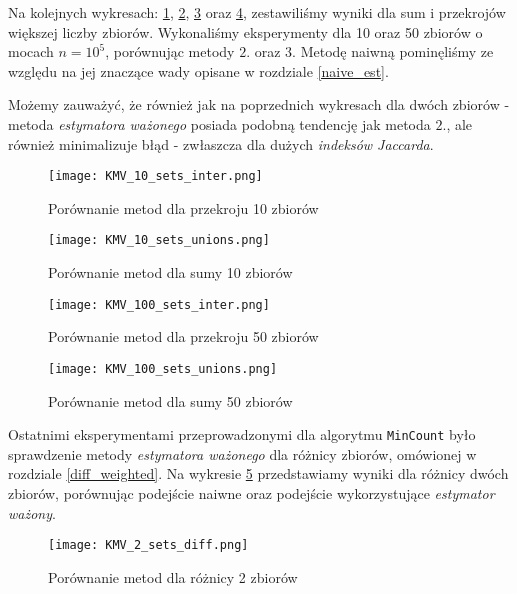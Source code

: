 Na kolejnych wykresach: \ref{fig:KMV_10sets_inter}, \ref{fig:KMV_10sets_unions}, \ref{fig:KMV_100sets_inter} oraz \ref{fig:KMV_100sets_unions}, zestawiliśmy wyniki dla sum i przekrojów większej liczby zbiorów. Wykonaliśmy eksperymenty dla 10 oraz 50 zbiorów o mocach $n = 10^5$, porównując metody $2.$ oraz $3.$ Metodę naiwną pominęliśmy ze względu na jej znaczące wady opisane w rozdziale \ref{naive_est}. 

Możemy zauważyć, że również jak na poprzednich wykresach dla dwóch zbiorów - metoda \textit{estymatora ważonego} posiada podobną tendencję jak metoda $2.$, ale również minimalizuje błąd - zwłaszcza dla dużych \textit{indeksów Jaccarda}.

\begin{figure}[h!]
    \texttt{[image: KMV\_10\_sets\_inter.png]}
    \centering
    \caption{Porównanie metod dla przekroju 10 zbiorów}
    \label{fig:KMV_10sets_inter}
\end{figure}

\begin{figure}[h!]
    \texttt{[image: KMV\_10\_sets\_unions.png]}
    \centering
    \caption{Porównanie metod dla sumy 10 zbiorów}
    \label{fig:KMV_10sets_unions}
\end{figure}

\begin{figure}[h!]
    \texttt{[image: KMV\_100\_sets\_inter.png]}
    \centering
    \caption{Porównanie metod dla przekroju 50 zbiorów}
    \label{fig:KMV_100sets_inter}
\end{figure}

\begin{figure}[h!]
    \texttt{[image: KMV\_100\_sets\_unions.png]}
    \centering
    \caption{Porównanie metod dla sumy 50 zbiorów}
    \label{fig:KMV_100sets_unions}
\end{figure}

Ostatnimi eksperymentami przeprowadzonymi dla algorytmu \texttt{MinCount} było sprawdzenie metody \textit{estymatora ważonego} dla różnicy zbiorów, omówionej w rozdziale \ref{diff_weighted}. Na wykresie \ref{fig:KMV_2_sets_diff} przedstawiamy wyniki dla różnicy dwóch zbiorów, porównując podejście naiwne oraz podejście wykorzystujące \textit{estymator ważony}.

\begin{figure}[h!]
    \texttt{[image: KMV\_2\_sets\_diff.png]}
    \centering
    \caption{Porównanie metod dla różnicy 2 zbiorów}
    \label{fig:KMV_2_sets_diff}
\end{figure}

